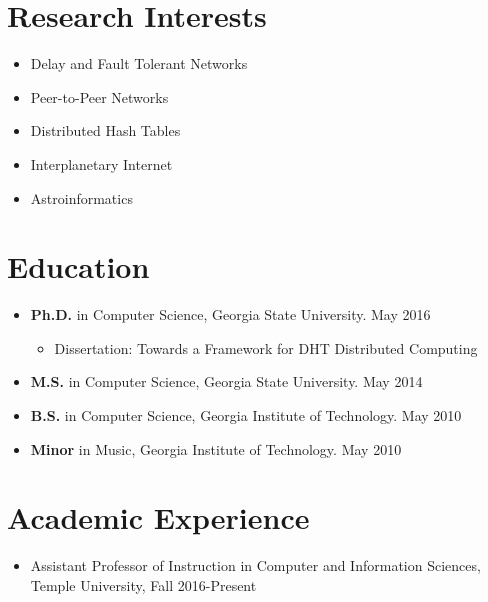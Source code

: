 \documentclass{res}
\begin{document}
\begin{resume} 

\section{Research Interests}
	\begin{itemize}
    \item Delay and Fault Tolerant Networks
    \item Peer-to-Peer Networks
	\item Distributed Hash Tables
	\item Interplanetary Internet 
	\item Astroinformatics
	
	\end{itemize}
\section{Education}          
    \begin{itemize}    
    \item {\bf Ph.D.} in Computer Science, Georgia State University. May 2016
    \begin{itemize}
    	\item Dissertation: Towards a Framework for DHT Distributed Computing
    \end{itemize}
    \item {\bf M.S.} in Computer Science, Georgia State University. May 2014 
    \item {\bf B.S.} in Computer Science, Georgia Institute of Technology. May 2010
	\item {\bf Minor} in Music, Georgia Institute of Technology. May 2010
    
    \end{itemize}   


\section{Academic Experience}
	\begin{itemize}
		\item  Assistant Professor of Instruction in Computer and Information Sciences, Temple University, Fall 2016-Present
	\end{itemize}



\end{resume}
\end{document}
